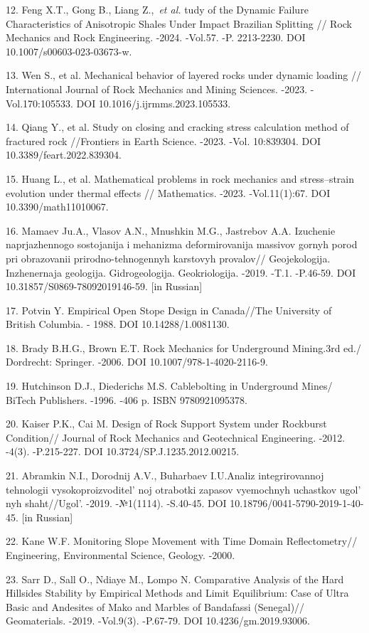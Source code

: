 \begin{refs}
12. Feng X.T., Gong B., Liang Z.,~\emph{et al.} tudy of the Dynamic
Failure Characteristics of Anisotropic Shales Under Impact Brazilian
Splitting // Rock Mechanics and Rock Engineering. -2024. -Vol.57. -P.
2213-2230. DOI 10.1007/s00603-023-03673-w.

13. Wen S., et al. Mechanical behavior of layered rocks under dynamic
loading // International Journal of Rock Mechanics and Mining Sciences.
-2023. -Vol.170:105533. DOI 10.1016/j.ijrmms.2023.105533.

14. Qiang Y., et al. Study on closing and cracking stress calculation
method of fractured rock //Frontiers in Earth Science. -2023. -Vol.
10:839304. DOI 10.3389/feart.2022.839304.

15. Huang L., et al. Mathematical problems in rock mechanics and
stress--strain evolution under thermal effects // Mathematics. -2023.
-Vol.11(1):67. DOI 10.3390/math11010067.

16. Mamaev Ju.A., Vlasov A.N., Mnushkin M.G., Jastrebov A.A. Izuchenie
naprjazhennogo sostojanija i mehanizma deformirovanija massivov gornyh
porod pri obrazovanii prirodno-tehnogennyh karstovyh provalov//
Geojekologija. Inzhenernaja geologija. Gidrogeologija. Geokriologija.
-2019. -T.1. -P.46-59. DOI 10.31857/S0869-78092019146-59. {[}in
Russian{]}

17. Potvin Y. Empirical Open Stope Design in Canada//The University of
British Columbia. - 1988. DOI 10.14288/1.0081130.

18. Brady B.H.G., Brown E.T. Rock Mechanics for Underground Mining.3rd
ed./ Dordrecht: Springer. -2006. DOI 10.1007/978-1-4020-2116-9.

19. Hutchinson D.J., Diederichs M.S. Cablebolting in Underground Mines/
BiTech Publishers. -1996. -406 p. ISBN 9780921095378.

20. Kaiser P.K., Cai M. Design of Rock Support System under Rockburst
Condition// Journal of Rock Mechanics and Geotechnical Engineering.
-2012. -4(3). -P.215-227. DOI 10.3724/SP.J.1235.2012.00215.

21. Abramkin N.I., Dorodnij A.V., Buharbaev I.U.Analiz integrirovannoj
tehnologii vysokoproizvoditel' noj otrabotki zapasov
vyemochnyh uchastkov ugol' nyh
shaht//Ugol'. -2019. -№1(1114). -S.40-45. DOI
10.18796/0041-5790-2019-1-40-45. {[}in Russian{]}

22. Kane W.F. Monitoring Slope Movement with Time Domain Reflectometry//
Engineering, Environmental Science, Geology. -2000.

23. Sarr D., Sall O., Ndiaye M., Lompo N. Comparative Analysis of the
Hard Hillsides Stability by Empirical Methods and Limit Equilibrium:
Case of Ultra Basic and Andesites of Mako and Marbles of Bandafassi
(Senegal)// Geomaterials. -2019. -Vol.9(3). -P.67-79. DOI
10.4236/gm.2019.93006.


\end{refs}
